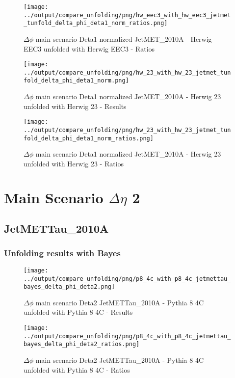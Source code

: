 \documentclass[11pt]{book}
\begin{document}
\begin{figure}[ht]
\centering
\texttt{[image: ../output/compare\_unfolding/png/hw\_eec3\_with\_hw\_eec3\_jetmet\_tunfold\_delta\_phi\_deta1\_norm\_ratios.png]}
\caption{$\Delta\phi$ main scenario Deta1 normalized JetMET\_2010A - Herwig EEC3 unfolded with Herwig EEC3 - Ratios}
\label{hw_eec3_hw_eec3_jetmet_tunfold_delta_phi_deta1_norm_b}
\end{figure}

\begin{figure}[ht]
\centering
\texttt{[image: ../output/compare\_unfolding/png/hw\_23\_with\_hw\_23\_jetmet\_tunfold\_delta\_phi\_deta1\_norm.png]}
\caption{$\Delta\phi$ main scenario Deta1 normalized JetMET\_2010A - Herwig 23 unfolded with Herwig 23 - Results}
\label{hw_23_hw_23_jetmet_tunfold_delta_phi_deta1_norm_a}
\end{figure}

\begin{figure}[ht]
\centering
\texttt{[image: ../output/compare\_unfolding/png/hw\_23\_with\_hw\_23\_jetmet\_tunfold\_delta\_phi\_deta1\_norm\_ratios.png]}
\caption{$\Delta\phi$ main scenario Deta1 normalized JetMET\_2010A - Herwig 23 unfolded with Herwig 23 - Ratios}
\label{hw_23_hw_23_jetmet_tunfold_delta_phi_deta1_norm_b}
\end{figure}


\clearpage
\chapter{Main Scenario $\Delta\eta$ 2 }
\section{JetMETTau\_2010A}
\subsection{Unfolding results with Bayes}

\begin{figure}[ht]
\centering
\texttt{[image: ../output/compare\_unfolding/png/p8\_4c\_with\_p8\_4c\_jetmettau\_bayes\_delta\_phi\_deta2.png]}
\caption{$\Delta\phi$ main scenario Deta2 JetMETTau\_2010A - Pythia 8 4C unfolded with Pythia 8 4C - Results}
\label{p8_p8_jetmettau_bayes_delta_phi_deta2_a}
\end{figure}

\begin{figure}[ht]
\centering
\texttt{[image: ../output/compare\_unfolding/png/p8\_4c\_with\_p8\_4c\_jetmettau\_bayes\_delta\_phi\_deta2\_ratios.png]}
\caption{$\Delta\phi$ main scenario Deta2 JetMETTau\_2010A - Pythia 8 4C unfolded with Pythia 8 4C - Ratios}
\label{p8_p8_jetmettau_bayes_delta_phi_deta2_b}
\end{figure}
\end{document}
